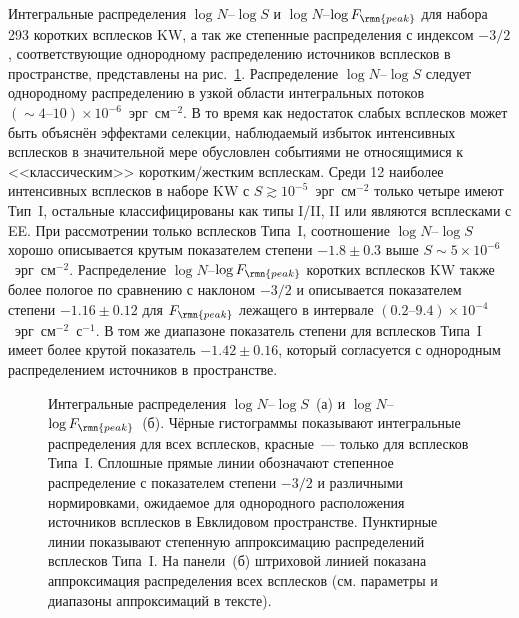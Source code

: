 Интегральные распределения $\log N$--$\log S$ и $\log N$--$\log F_\rmn{peak}$
для набора 293 коротких всплесков KW, а так же степенные распределения с индексом $-3/2$, 
соответствующие однородному распределению источников всплесков в пространстве,
представлены на рис.~\ref{fig:logNlogS_PF}.
Распределение $\log N$--$\log S$ следует однородному распределению в узкой 
области интегральных потоков $(\sim 4\textrm{--}10)\times 10^{-6}$~эрг~см$^{-2}$.
В то время как недостаток слабых всплесков может быть объяснён эффектами селекции,
наблюдаемый избыток интенсивных всплесков в значительной мере обусловлен событиями 
не относящимися к <<классическим>> коротким/жестким всплескам. Среди 12 наиболее 
интенсивных всплесков в наборе KW с $S \gtrsim 10^{-5}$~эрг~см$^{-2}$ только 
четыре имеют Тип~I, остальные классифицированы как типы I/II, II или являются всплесками с EE.
При рассмотрении только всплесков Типа~I, соотношение $\log N$--$\log S$ хорошо 
описывается крутым показателем степени $-1.8 \pm 0.3$ выше $S\sim 5\times 10^{-6}$~эрг~см$^{-2}$.
Распределение $\log N$--$\log F_\rmn{peak}$ коротких всплесков KW также более пологое 
по сравнению с наклоном $-3/2$ и описывается показателем степени 
$-1.16 \pm 0.12$ для $F_\rmn{peak}$ лежащего в интервале
$(0.2\textrm{--}9.4)\times 10^{-4}$~эрг~см$^{-2}$~с$^{-1}$.
В том же диапазоне показатель степени для всплесков Типа~I имеет более крутой показатель 
$-1.42 \pm 0.16$, который согласуется с однородным распределением источников в пространстве.

\begin{figure}
    \begin{minipage}[h]{0.5\textwidth}
    \end{minipage}
    \hfill
    \begin{minipage}[h]{0.5\textwidth}
	\end{minipage}
\caption{
    Интегральные распределения $\log N$--$\log S$~(а) и $\log N$--$\log F_\rmn{peak}$~(б).
    Чёрные гистограммы показывают интегральные распределения для всех всплесков, 
    красные~--- только для всплесков Типа~I. Сплошные прямые линии обозначают 
    степенное распределение с показателем степени $-3/2$ и различными нормировками, 
    ожидаемое для однородного расположения источников всплесков в Евклидовом пространстве.
    Пунктирные линии показывают степенную аппроксимацию распределений всплесков Типа~I.
    На панели~(б) штриховой линией показана аппроксимация распределения всех всплесков 
    (см. параметры и диапазоны аппроксимаций в тексте).
    \label{fig:logNlogS_PF} }
\end{figure}

